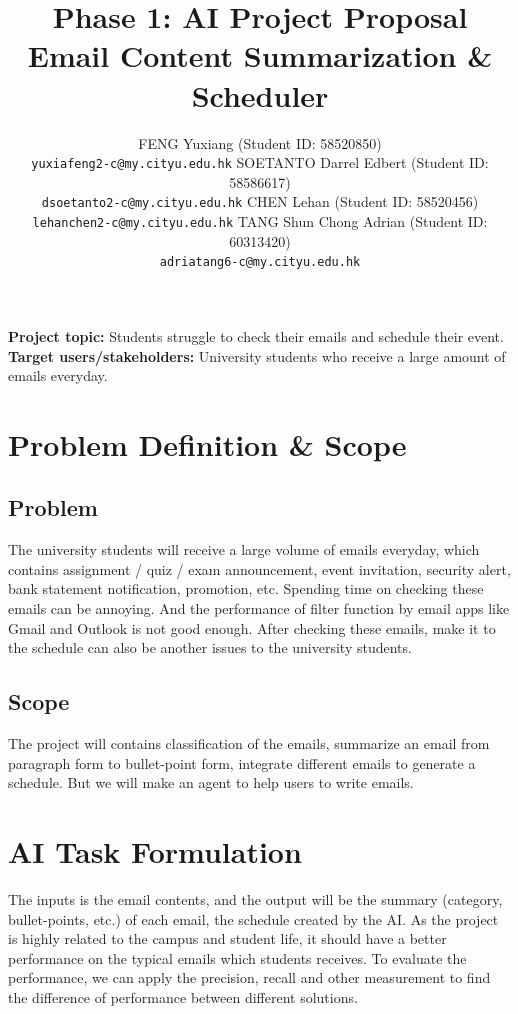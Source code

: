 \documentclass{article}
\title{Phase 1: AI Project Proposal\\
\large Email Content Summarization \& Scheduler}
\author{
  FENG Yuxiang (Student ID: 58520850)\\
  \texttt{yuxiafeng2-c@my.cityu.edu.hk}
  \And 
  SOETANTO Darrel Edbert (Student ID: 58586617)\\
  \texttt{dsoetanto2-c@my.cityu.edu.hk}
  \AND
  CHEN Lehan (Student ID: 58520456)\\
  \texttt{lehanchen2-c@my.cityu.edu.hk}
  \And
  TANG Shun Chong Adrian (Student ID: 60313420)\\
  \texttt{adriatang6-c@my.cityu.edu.hk}
}
\begin{document}
\maketitle

\noindent\textbf{Project topic:} Students struggle to check their emails and schedule their event.\\
\textbf{Target users/stakeholders:} University students who receive a large amount of emails everyday.


\section{Problem Definition \& Scope}
\subsection{Problem}

The university students will receive a large volume of emails everyday, which contains assignment / quiz / exam announcement, event invitation, security alert, bank statement notification, promotion, etc. Spending time on checking these emails can be annoying. And the performance of filter function by email apps like Gmail and Outlook is not good enough. After checking these emails, make it to the schedule can also be another issues to the university students.

\subsection{Scope}

The project will contains classification of the emails, summarize an email from paragraph form to bullet-point form, integrate different emails to generate a schedule. But we will make an agent to help users to write emails.

\section{AI Task Formulation}

The inputs is the email contents, and the output will be the summary (category, bullet-points, etc.) of each email, the schedule created by the AI. As the project is highly related to the campus and student life, it should have a better performance on the typical emails which students receives. To evaluate the performance, we can apply the precision, recall and other measurement to find the difference of performance between different solutions.
\end{document}
